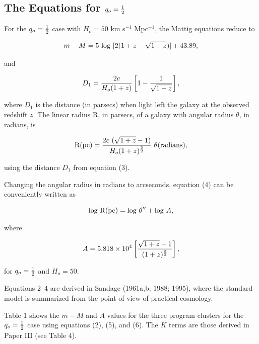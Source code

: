 \documentclass[preprint]{aastex}
\begin{document}
\subsection{The Equations for $q_o = {1\over{2}}$}
      
For the $q_o = {1\over{2}}$ case with $H_o = 50$ km s$^{-1}$
Mpc$^{-1}$, the Mattig equations reduce to

\begin{equation}
m - M = 5~{\rm log}~[2(1+z - \sqrt{1+z})] + 43.89,
\end{equation}

\noindent and 

\begin{equation}
D_1 = {{2c}\over{H_o(1+z)}}\left [1 - {1\over{\sqrt{1+z}}}\right],
\end{equation}

\noindent where $D_1$ is the distance (in parsecs) when light left the
galaxy at the observed redshift $z$. The linear radius R, in parsecs,
of a galaxy with angular radius $\theta$, in radians, is

\begin{equation}
        {\rm R(pc)} = {{2c~(\sqrt{1+z}-1)}\over{H_o(1+z)^{3\over{2}}}}~\theta
        ({\rm radians}),
\end{equation}

\noindent using the distance $D_1$ from equation (3).

Changing the angular radius in radians to arcseconds, equation (4) can
be conveniently written as

\begin{equation}
{\rm log~R(pc)} = {\rm log}~\theta'' + {\rm log}~A,
\end{equation}

\noindent where 

\begin{equation}
A = 5.818 \times 10^4 \left [{\sqrt{1+z} - 1}\over{(1+z)^{3\over{2}}}
\right ],
\end{equation}

\noindent for $q_o = {1\over{2}}$ and $H_o = 50$. 

Equations 2--4 are derived in Sandage (1961a,b; 1988; 1995), where the
standard model is summarized from the point of view of practical
cosmology.

Table 1 shows the $m - M$ and $A$ values for the three program
clusters for the $q_o = {1\over{2}}$ case using equations (2), (5),
and (6).  The $K$ terms are those derived in Paper III (see Table 4).
\end{document}
